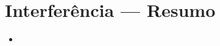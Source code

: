 %
\newpage
\section*{Interferência --- Resumo}
\tobedone{}
\begin{itemize}[leftmargin=*]
  \item
\end{itemize}
